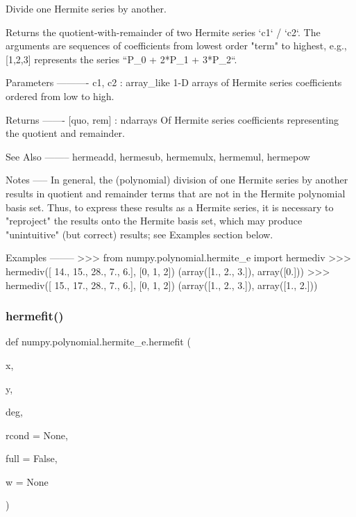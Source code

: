 \begin{DoxyVerb}Divide one Hermite series by another.

Returns the quotient-with-remainder of two Hermite series
`c1` / `c2`.  The arguments are sequences of coefficients from lowest
order "term" to highest, e.g., [1,2,3] represents the series
``P_0 + 2*P_1 + 3*P_2``.

Parameters
----------
c1, c2 : array_like
    1-D arrays of Hermite series coefficients ordered from low to
    high.

Returns
-------
[quo, rem] : ndarrays
    Of Hermite series coefficients representing the quotient and
    remainder.

See Also
--------
hermeadd, hermesub, hermemulx, hermemul, hermepow

Notes
-----
In general, the (polynomial) division of one Hermite series by another
results in quotient and remainder terms that are not in the Hermite
polynomial basis set.  Thus, to express these results as a Hermite
series, it is necessary to "reproject" the results onto the Hermite
basis set, which may produce "unintuitive" (but correct) results; see
Examples section below.

Examples
--------
>>> from numpy.polynomial.hermite_e import hermediv
>>> hermediv([ 14.,  15.,  28.,   7.,   6.], [0, 1, 2])
(array([1., 2., 3.]), array([0.]))
>>> hermediv([ 15.,  17.,  28.,   7.,   6.], [0, 1, 2])
(array([1., 2., 3.]), array([1., 2.]))\end{DoxyVerb}
 \mbox{\label{namespacenumpy_1_1polynomial_1_1hermite__e_a7ecee17361686a74c851e9014b5a9f64}} 
\subsubsection{\texorpdfstring{hermefit()}{hermefit()}}
{\footnotesize\ttfamily def numpy.\+polynomial.\+hermite\+\_\+e.\+hermefit (\begin{DoxyParamCaption}\item[{}]{x,  }\item[{}]{y,  }\item[{}]{deg,  }\item[{}]{rcond = {\ttfamily None},  }\item[{}]{full = {\ttfamily False},  }\item[{}]{w = {\ttfamily None} }\end{DoxyParamCaption})}

